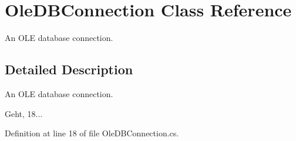 \section{Ole\-D\-B\-Connection Class Reference}
\label{class_ole_d_b_connection}


An O\-L\-E database connection.  




\subsection{Detailed Description}
An O\-L\-E database connection. 

Geht, 18... 

Definition at line 18 of file Ole\-D\-B\-Connection.\-cs.

